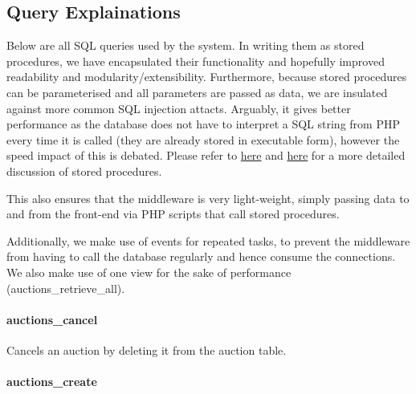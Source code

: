 \subsection{Query Explainations}\label{query-explainations}

Below are all SQL queries used by the system. In writing them as stored
procedures, we have encapsulated their functionality and hopefully
improved readability and modularity/extensibility. Furthermore, because
stored procedures can be parameterised and all parameters are passed as
data, we are insulated against more common SQL injection attacts.
Arguably, it gives better performance as the database does not have to
interpret a SQL string from PHP every time it is called (they are
already stored in executable form), however the speed impact of this is
debated. Please refer to
\href{https://docs.oracle.com/cd/F49540_01/DOC/java.815/a64686/01_intr3.htm}{here}
and
\href{http://sqlblog.com/blogs/paul_nielsen/archive/2009/05/09/why-use-stored-procedures.aspx}{here}
for a more detailed discussion of stored procedures.

This also ensures that the middleware is very light-weight, simply
passing data to and from the front-end via PHP scripts that call stored
procedures.

Additionally, we make use of events for repeated tasks, to prevent the
middleware from having to call the database regularly and hence consume
the connections. We also make use of one view for the sake of
performance (auctions\_retrieve\_all).

\paragraph{auctions\_cancel}\label{auctionsux5fcancel}

Cancels an auction by deleting it from the auction table.

\begin{Shaded}
\begin{Highlighting}[]
  \NormalTok{(}\NormalTok{))}
       
\end{Highlighting}
\end{Shaded}

\paragraph{auctions\_create}\label{auctionsux5fcreate}

